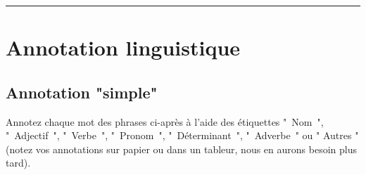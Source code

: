 
\newcommand{\numTD}{TD7}
\newcommand{\themeTD}{Annotation et Evaluation}


\hrule

\noindent{}


\section{Annotation linguistique}



  \subsection{Annotation "simple"}

 Annotez chaque mot des phrases ci-après à l'aide des étiquettes " Nom ", " Adjectif ", " Verbe ", " Pronom ", " Déterminant ", " Adverbe " ou " Autres " (notez vos annotations  sur papier ou dans un tableur, nous en aurons besoin plus tard).

